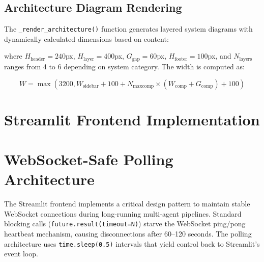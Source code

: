 \documentclass[a4paper,12pt,openany]{report}
\begin{document}
\subsection{Architecture Diagram Rendering}

The \texttt{\_render\_architecture()} function generates layered system diagrams with dynamically calculated dimensions based on content:

where $H_{\text{header}} = 240$px, $H_{\text{layer}} = 400$px, $G_{\text{gap}} = 60$px, $H_{\text{footer}} = 100$px, and $N_{\text{layers}}$ ranges from 4 to 6 depending on system category. The width is computed as:

\begin{equation}
W = \max(3200, W_{\text{sidebar}} + 100 + N_{\text{maxcomp}} \times (W_{\text{comp}} + G_{\text{comp}}) + 100)
\label{eq:diagram_width}
\end{equation}

\section{Streamlit Frontend Implementation}

\section{WebSocket-Safe Polling Architecture}

The Streamlit frontend implements a critical design pattern to maintain stable WebSocket connections during long-running multi-agent pipelines. Standard blocking calls (\texttt{future.result(timeout=N)}) starve the WebSocket ping/pong heartbeat mechanism, causing disconnections after 60--120 seconds. The polling architecture uses \texttt{time.sleep(0.5)} intervals that yield control back to Streamlit's event loop.
\end{document}
